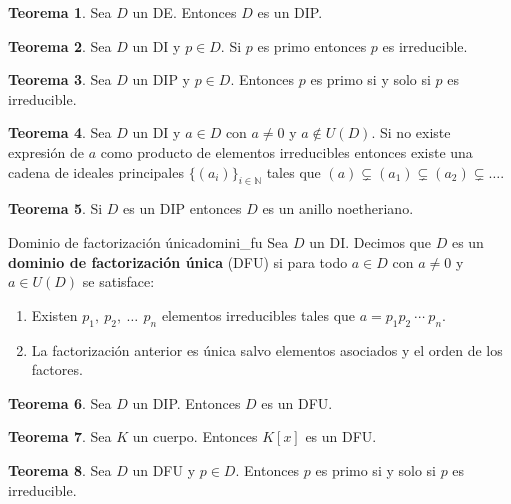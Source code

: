 \documentclass[a4paper]{book}
\theoremstyle{definition}
\newtheorem{theorem}{Teorema}[section]
\theoremstyle{ejemplo}
\theoremstyle{demostracion}
\newcommand{\naturales}{\mathbb{N}}
\begin{document}
\begin{theorem}
	Sea $D$ un DE. Entonces $D$ es un DIP.
\end{theorem}

\begin{theorem}
	Sea $D$ un DI y $p \in D$. Si $p$ es primo entonces $p$ es irreducible.
\end{theorem}

\begin{theorem}
	Sea $D$ un DIP y $p \in D$. Entonces $p$ es primo si y solo si $p$ es irreducible.
\end{theorem}

\begin{theorem}
	Sea $D$ un DI y $a \in D$ con $a \neq 0$ y $a \not \in U(D)$. Si no existe expresión de $a$ como producto de elementos irreducibles entonces existe una cadena de ideales principales $\{ (a_i) \}_{i \in \naturales}$ tales que $(a) \subsetneq (a_1) \subsetneq (a_2) \subsetneq \ldots$.
\end{theorem}

\begin{theorem}
	Si $D$ es un DIP entonces $D$ es un anillo noetheriano.
\end{theorem}

\begin{define}{Dominio de factorización única}{domini_fu}
	Sea $D$ un DI. Decimos que $D$ es un \textbf{dominio de factorización única} (DFU) si para todo $a \in D$ con $a \neq 0$ y $a \in U(D)$ se satisface:
	\begin{enumerate}
		\item
		Existen $p_1,\ p_2,\ \ldots\ \, p_n$ elementos irreducibles tales que $a = p_1 p_2\ \cdots\ p_n$.
		\item
		La factorización anterior es única salvo elementos asociados y el orden de los factores.
	\end{enumerate}
\end{define}

\begin{theorem}
	Sea $D$ un DIP. Entonces $D$ es un DFU.
\end{theorem}

\begin{theorem}
	Sea $K$ un cuerpo. Entonces $K[x]$ es un DFU.
\end{theorem}

\begin{theorem}
	Sea $D$ un DFU y $p \in D$. Entonces $p$ es primo si y solo si $p$ es irreducible.
\end{theorem}
\end{document}

